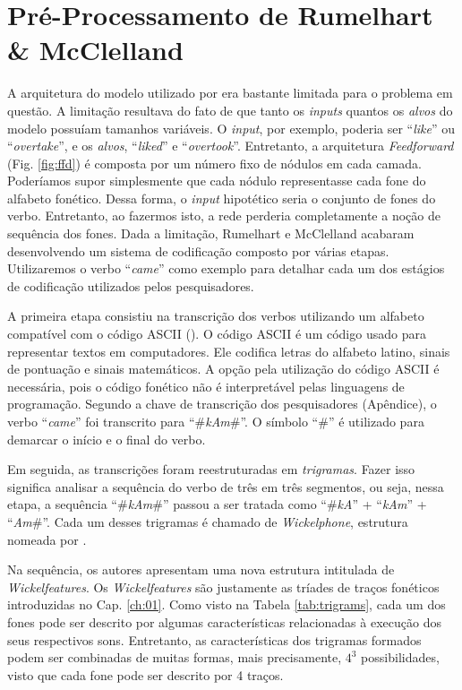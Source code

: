 \section{Pré-Processamento de Rumelhart \& McClelland}
\label{sec:transcr}
A arquitetura do modelo utilizado por \cite{rumelhart:1986} era bastante limitada para o problema em questão. A limitação resultava do fato de que tanto os \textit{inputs} quantos os \textit{alvos} do modelo possuíam tamanhos variáveis. O \textit{input}, por exemplo, poderia ser “\textit{like}” ou “\textit{overtake}”, e os \textit{alvos}, “\textit{liked}” e “\textit{overtook}”. Entretanto, a arquitetura \textit{Feedforward} (Fig. \ref{fig:ffd}) é composta por um número fixo de nódulos em cada camada. Poderíamos supor simplesmente que cada nódulo representasse cada fone do alfabeto fonético. Dessa forma, o \textit{input} hipotético seria o conjunto de fones do verbo. Entretanto, ao fazermos isto, a rede perderia completamente a noção de sequência dos fones. Dada a limitação, Rumelhart e McClelland acabaram desenvolvendo um sistema de codificação composto por várias etapas. Utilizaremos o verbo “\textit{came}” como exemplo para detalhar cada um dos estágios de codificação utilizados pelos pesquisadores.

A primeira etapa consistiu na transcrição dos verbos utilizando um alfabeto compatível com o código ASCII (\cite{mackenzie1980coded}). O código ASCII é um código 
usado para representar textos em computadores. Ele codifica letras do alfabeto latino, sinais de pontuação e sinais matemáticos. A opção pela utilização do código ASCII é necessária, pois o código fonético não é interpretável pelas linguagens de programação. Segundo a chave de transcrição dos pesquisadores (Apêndice), o verbo “\textit{came}” foi transcrito para “\#\textit{kAm}\#”. O símbolo “\#” é utilizado para demarcar o início e o final do verbo. 

Em seguida, as transcrições foram reestruturadas em \textit{trigramas}. Fazer isso significa analisar a sequência do verbo de três em três segmentos, ou seja, nessa etapa, a sequência “\#\textit{kAm}\#” passou a ser tratada como “\#\textit{kA}” + “\textit{kAm}” + “\textit{Am}\#”. Cada um desses trigramas é chamado de \textit{Wickelphone}, estrutura nomeada por \cite{wickelgren:1969}.

Na sequência, os autores apresentam uma nova estrutura intitulada de \textit{Wickelfeatures}. Os \textit{Wickelfeatures} são justamente as tríades de traços fonéticos introduzidas no Cap. \ref{ch:01}. Como visto na Tabela \ref{tab:trigrams}, cada um dos fones pode ser descrito por algumas características relacionadas à execução dos seus respectivos sons. Entretanto, as características dos trigramas formados podem ser combinadas de muitas formas, mais precisamente, $4^{3}$ possibilidades, visto que cada fone pode ser descrito por 4 traços. 

